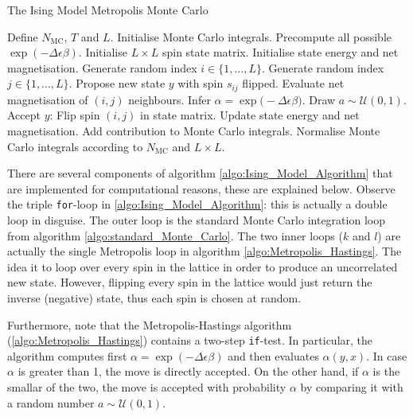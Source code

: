 \documentclass[nofootinbib,reprint,english]{revtex4-1}
\begin{document}
\begin{algorithm}[H]
\caption{The Ising Model Metropolis Monte Carlo}\label{algo:Ising_Model_Algorithm}
\begin{algorithmic}[1]
\State Define \(N_\text{MC}\), \(T\) and \(L\).
\State Initialise Monte Carlo integrals.
\State Precompute all possible \(\exp(-\Delta\epsilon\beta)\).
\State Initialise \(L\times L\) spin state matrix.
\State Initialise state energy and net magnetisation.
			\State Generate random index \(i\in\{1,\ldots,L\}\).
			\State Generate random index \(j\in\{1,\ldots,L\}\).
			\State Propose new state \(y\) with spin \(s_{ij}\) flipped.
			\State Evaluate net magnetisation of \((i,j)\) neighbours.
			\State Infer \(\alpha=\exp\big(-\Delta\epsilon\beta\big)\).
			\State Draw \(a\sim\mathcal{U}(0,1)\).
				\State Accept \(y\): Flip spin \((i,j)\) in state matrix.
				\State Update state energy and net magnetisation.
			\EndIf
		\EndFor
	\EndFor
	\State Add contribution to Monte Carlo integrals.
\EndFor
\State Normalise Monte Carlo integrals according to \(N_\text{MC}\) and \(L\times L\).
\end{algorithmic}
\end{algorithm}
There are several components of algorithm \ref{algo:Ising_Model_Algorithm} that are implemented for computational reasons, these are explained below. Observe the triple \texttt{for}-loop in \ref{algo:Ising_Model_Algorithm}: this is actually a double loop in disguise. The outer loop is the standard Monte Carlo integration loop from algorithm \ref{algo:standard_Monte_Carlo}. The two inner loops (\(k\) and \(l\)) are actually the single Metropolis loop in algorithm \ref{algo:Metropolis_Hastings}. The idea it to loop over every spin in the lattice in order to produce an uncorrelated new state. However, flipping every spin in the lattice would just return the inverse (negative) state, thus each spin is chosen at random.

Furthermore, note that the Metropolis-Hastings algorithm (\ref{algo:Metropolis_Hastings}) contains a two-step \texttt{if}-test. In particular, the algorithm computes first \(\alpha=\exp(-\Delta\epsilon\beta)\) and then evaluates \(\alpha(y,x)\). In case \(\alpha\) is greater than 1, the move is directly accepted. On the other hand, if \(\alpha\) is the smallar of the two, the move is accepted with probability \(\alpha\) by comparing it with a random number \(a\sim\mathcal{U}(0,1)\). 
\end{document}
